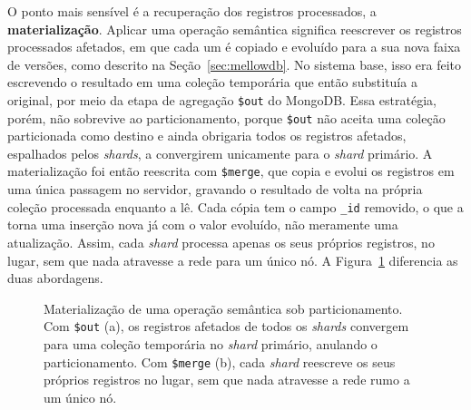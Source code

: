O ponto mais sensível é a recuperação dos registros processados, a \textbf{materialização}. Aplicar uma operação semântica significa reescrever os registros processados afetados, em que cada um é copiado e evoluído para a sua nova faixa de versões, como descrito na Seção~\ref{sec:mellowdb}. No sistema base, isso era feito escrevendo o resultado em uma coleção temporária que então substituía a original, por meio da etapa de agregação \texttt{\$out} do MongoDB. Essa estratégia, porém, não sobrevive ao particionamento, porque \texttt{\$out} não aceita uma coleção particionada como destino e ainda obrigaria todos os registros afetados, espalhados pelos \textit{shards}, a convergirem unicamente para o \textit{shard} primário. A materialização foi então reescrita com \texttt{\$merge}, que copia e evolui os registros em uma única passagem no servidor, gravando o resultado de volta na própria coleção processada enquanto a lê. Cada cópia tem o campo \texttt{\_id} removido, o que a torna uma inserção nova já com o valor evoluído, não meramente uma atualização. Assim, cada \textit{shard} processa apenas os seus próprios registros, no lugar, sem que nada atravesse a rede para um único nó. A Figura~\ref{fig:materializacao} diferencia as duas abordagens.

\begin{figure}[htb]
  \centering
  \caption{Materialização de uma operação semântica sob particionamento. Com \texttt{\$out} (a), os registros afetados de todos os \textit{shards} convergem para uma coleção temporária no \textit{shard} primário, anulando o particionamento. Com \texttt{\$merge} (b), cada \textit{shard} reescreve os seus próprios registros no lugar, sem que nada atravesse a rede rumo a um único nó.}
  \label{fig:materializacao}
\end{figure}

